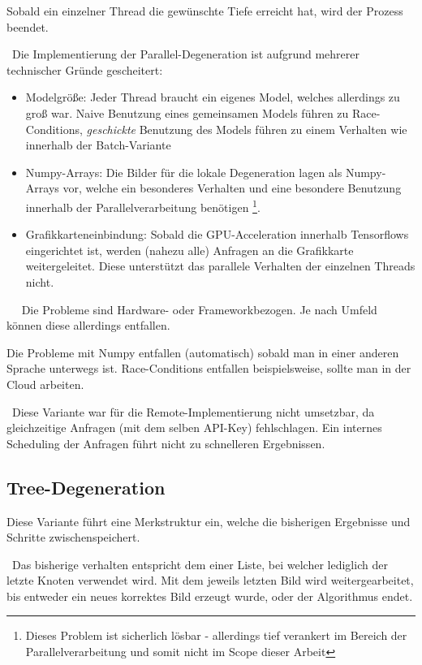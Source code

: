 Sobald ein einzelner Thread die gewünschte Tiefe erreicht hat, wird der Prozess beendet. 

~\newline Die Implementierung der Parallel-Degeneration ist aufgrund mehrerer technischer Gründe gescheitert: 

\begin{itemize}
	\item Modelgröße: Jeder Thread braucht ein eigenes Model, welches allerdings zu groß war. Naive Benutzung eines gemeinsamen Models führen zu Race-Conditions, \textit{geschickte} Benutzung des Models führen zu einem Verhalten wie innerhalb der Batch-Variante
	\item Numpy-Arrays: Die Bilder für die lokale Degeneration lagen als Numpy-Arrays vor, welche ein besonderes Verhalten und eine besondere Benutzung innerhalb der Parallelverarbeitung benötigen \footnote{Dieses Problem ist sicherlich lösbar - allerdings tief verankert im Bereich der Parallelverarbeitung und somit nicht im Scope dieser Arbeit}. 
	\item Grafikkarteneinbindung: Sobald die GPU-Acceleration innerhalb Tensorflows eingerichtet ist, werden (nahezu alle) Anfragen an die Grafikkarte weitergeleitet. Diese unterstützt das parallele Verhalten der einzelnen Threads nicht. 
\end{itemize} 
~\newline ~\newline
Die Probleme sind Hardware- oder Frameworkbezogen. Je nach Umfeld können diese allerdings entfallen. 

Die Probleme mit Numpy entfallen (automatisch) sobald man in einer anderen Sprache unterwegs ist. Race-Conditions entfallen beispielsweise, sollte man in der Cloud arbeiten.

~\newline Diese Variante war für die Remote-Implementierung nicht umsetzbar, da gleichzeitige Anfragen (mit dem selben API-Key) fehlschlagen. Ein internes Scheduling der Anfragen führt nicht zu schnelleren Ergebnissen. 
\subsection{Tree-Degeneration}
Diese Variante führt eine Merkstruktur ein, welche die bisherigen Ergebnisse und Schritte zwischenspeichert. 

~\newline Das bisherige verhalten entspricht dem einer Liste, bei welcher lediglich der letzte Knoten verwendet wird. Mit dem jeweils letzten Bild wird weitergearbeitet, bis entweder ein neues korrektes Bild erzeugt wurde, oder der Algorithmus endet. 

